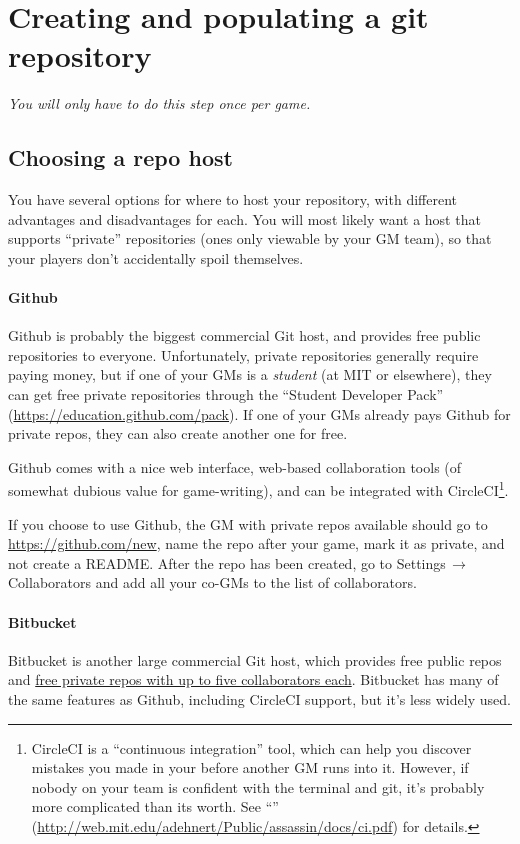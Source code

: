 \documentclass[green]{testgame}
\begin{document}
\section{Creating and populating a git repository}

{\em You will only have to do this step once per game.}

\subsection{Choosing a repo host}

You have several options for where to host your repository, with different advantages and disadvantages for each. You will most likely want a host that supports ``private'' repositories (ones only viewable by your GM team), so that your players don't accidentally spoil themselves.

\paragraph*{Github} Github is probably the biggest commercial Git host, and provides free public repositories to everyone. Unfortunately, private repositories generally require paying money, but if one of your GMs is a \emph{student} (at MIT or elsewhere), they can get free private repositories through the ``Student Developer Pack'' (\url{https://education.github.com/pack}). If one of your GMs already pays Github for private repos, they can also create another one for free.

Github comes with a nice web interface, web-based collaboration tools (of somewhat dubious value for game-writing), and can be integrated with CircleCI\footnote{CircleCI is a ``continuous integration'' tool, which can help you discover mistakes you made in your \gametex{} before another GM runs into it. However, if nobody on your team is confident with the terminal and git, it's probably more complicated than its worth. See ``\gCI{}'' (\url{http://web.mit.edu/adehnert/Public/assassin/docs/ci.pdf}) for details.}.

If you choose to use Github, the GM with private repos available should go to \url{https://github.com/new}, name the repo after your game, mark it as private, and not create a README. After the repo has been created, go to Settings$\,\to\,$Collaborators and add all your co-GMs to the list of collaborators.

\paragraph*{Bitbucket} Bitbucket is another large commercial Git host, which provides free public repos and \href{https://bitbucket.org/product/pricing/}{free private repos with up to five collaborators each}. Bitbucket has many of the same features as Github, including CircleCI support, but it's less widely used.
\end{document}
